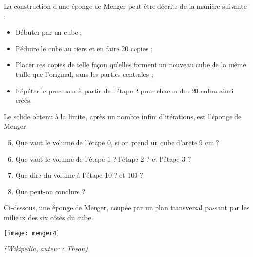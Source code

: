 \begin{TP}
La construction d'une éponge de Menger peut être décrite de la manière suivante :
\begin{itemize}
 \item Débuter par un cube ;
 \item Réduire le cube au tiers et en faire 20 copies ;
 \item Placer ces copies de telle façon qu'elles forment un nouveau cube de la même taille que l'original, sans les parties centrales ;
 \item Répéter le processus à partir de l'étape 2 pour chacun des 20 cubes ainsi créés.
 \end{itemize} 
Le solide obtenu à la limite, après un nombre infini d'itérations, est l'éponge de Menger.
\begin{enumerate}
 \setcounter{enumi}{4}
 \item Que vaut le volume de l'étape 0, si on prend un cube d'arête 9 cm ?
 \item Que vaut le volume de l'étape 1 ? l'étape 2 ? et l'étape 3 ?
 \item Que dire du volume à l'étape 10 ? et 100 ?
 \item Que peut-on conclure ?
 \end{enumerate}
Ci-dessous, une éponge de Menger, coupée par un plan transversal passant par les milieux des six côtés du cube.
 \begin{center} \texttt{[image: menger4]} \end{center}
 \qquad \qquad \qquad \qquad \qquad \qquad \qquad \qquad \qquad \qquad \small{\emph{(Wikipedia, auteur : Theon)}}
 
\end{TP}


